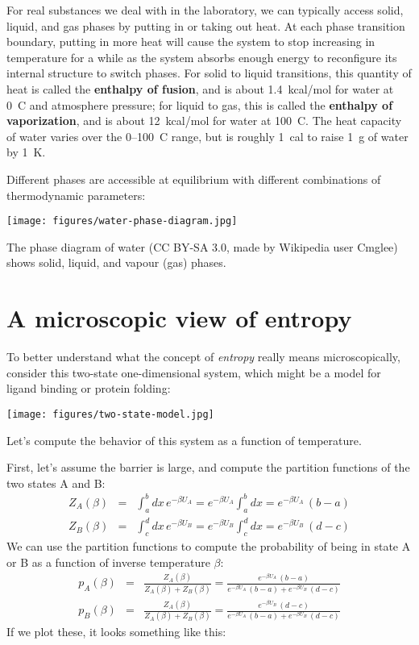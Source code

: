 \documentclass[english,course]{lecture}
\begin{document}
For real substances we deal with in the laboratory, we can typically access solid, liquid, and gas phases by putting in or taking out heat.
At each phase transition boundary, putting in more heat will cause the system to stop increasing in temperature for a while as the system absorbs enough energy to reconfigure its internal structure to switch phases.
For solid to liquid transitions, this quantity of heat is called the {\bf enthalpy of fusion}, and is about 1.4~kcal/mol for water at 0~C and atmosphere pressure; for liquid to gas, this is called the {\bf enthalpy of vaporization}, and is about 12~kcal/mol for water at 100~C.
The heat capacity of water varies over the 0--100~C range, but is roughly 1~cal to raise 1~g of water by 1~K.

Different phases are accessible at equilibrium with different combinations of thermodynamic parameters:

\begin{centering}
\texttt{[image: figures/water-phase-diagram.jpg]}

\end{centering}

The phase diagram of water (CC BY-SA 3.0, made by Wikipedia user Cmglee) shows solid, liquid, and vapour (gas) phases.

\section{A microscopic view of entropy}

To better understand what the concept of \emph{entropy} really means microscopically, consider this two-state one-dimensional system, which might be a model for ligand binding or protein folding:

\begin{centering}
\texttt{[image: figures/two-state-model.jpg]}

\end{centering}

Let's compute the behavior of this system as a function of temperature.

First, let's assume the barrier is large, and compute the partition functions of the two states A and B:
\begin{eqnarray}
Z_A(\beta) &=& \int_a^b dx \, e^{-\beta U_A} = e^{-\beta U_A} \int_a^b dx = e^{-\beta U_A} \, (b-a) \\
Z_B(\beta) &=& \int_c^d dx \, e^{-\beta U_B} = e^{-\beta U_B} \int_c^d dx = e^{-\beta U_B} \, (d-c)
\end{eqnarray}
We can use the partition functions to compute the probability of being in state A or B as a function of inverse temperature $\beta$:
\begin{eqnarray}
p_A(\beta) &=& \frac{Z_A(\beta)}{Z_A(\beta) + Z_B(\beta)} = \frac{e^{-\beta U_A} \, (b-a)}{ e^{-\beta U_A} \, (b-a) + e^{-\beta U_B} \, (d-c) } \\
p_B(\beta) &=& \frac{Z_A(\beta)}{Z_A(\beta) + Z_B(\beta)} = \frac{e^{-\beta U_B} \, (d-c)}{ e^{-\beta U_A} \, (b-a) + e^{-\beta U_B} \, (d-c) }
\end{eqnarray}
If we plot these, it looks something like this:
\end{document}
